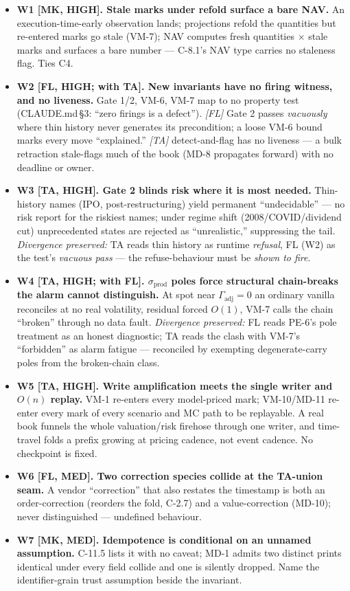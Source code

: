 \begin{itemize}\setlength{\itemsep}{0pt}
  \item \textbf{W1 [MK, HIGH]. Stale marks under refold surface a bare NAV.} An execution-time-early
  observation lands; projections refold the quantities but re-entered marks go stale (VM-7); NAV
  computes fresh quantities $\times$ stale marks and surfaces a bare number --- C-8.1's NAV type
  carries no staleness flag. Ties C4.
  \item \textbf{W2 [FL, HIGH; with TA]. New invariants have no firing witness, and no liveness.}
  Gate 1/2, VM-6, VM-7 map to no property test (CLAUDE.md\,\S3: ``zero firings is a defect'').
  \emph{[FL]} Gate 2 passes \emph{vacuously} where thin history never generates its precondition;
  a loose VM-6 bound marks every move ``explained.'' \emph{[TA]} detect-and-flag has no liveness
  --- a bulk retraction stale-flags much of the book (MD-8 propagates forward) with no deadline
  or owner.
  \item \textbf{W3 [TA, HIGH]. Gate 2 blinds risk where it is most needed.} Thin-history names
  (IPO, post-restructuring) yield permanent ``undecidable'' --- no risk report for the riskiest
  names; under regime shift (2008/COVID/dividend cut) unprecedented states are rejected as
  ``unrealistic,'' suppressing the tail. \emph{Divergence preserved:} TA reads thin history as
  runtime \emph{refusal}, FL (W2) as the test's \emph{vacuous pass} --- the refuse-behaviour must
  be \emph{shown to fire}.
  \item \textbf{W4 [TA, HIGH; with FL]. $\sigma_{\mathrm{prod}}$ poles force structural
  chain-breaks the alarm cannot distinguish.} At spot near $\Gamma_{\mathrm{adj}}=0$ an ordinary
  vanilla reconciles at no real volatility, residual forced $O(1)$, VM-7 calls the chain
  ``broken'' through no data fault. \emph{Divergence preserved:} FL reads PE-6's pole treatment
  as an honest diagnostic; TA reads the clash with VM-7's ``forbidden'' as alarm fatigue ---
  reconciled by exempting degenerate-carry poles from the broken-chain class.
  \item \textbf{W5 [TA, HIGH]. Write amplification meets the single writer and $O(n)$ replay.}
  VM-1 re-enters every model-priced mark; VM-10/MD-11 re-enter every mark of every scenario and
  MC path to be replayable. A real book funnels the whole valuation/risk firehose through one
  writer, and time-travel folds a prefix growing at pricing cadence, not event cadence. No
  checkpoint is fixed.
  \item \textbf{W6 [FL, MED]. Two correction species collide at the TA-union seam.} A vendor
  ``correction'' that also restates the timestamp is both an order-correction (reorders the fold,
  C-2.7) and a value-correction (MD-10); never distinguished --- undefined behaviour.
  \item \textbf{W7 [MK, MED]. Idempotence is conditional on an unnamed assumption.} C-11.5 lists
  it with no caveat; MD-1 admits two distinct prints identical under every field collide and one
  is silently dropped. Name the identifier-grain trust assumption beside the invariant.
\end{itemize}
